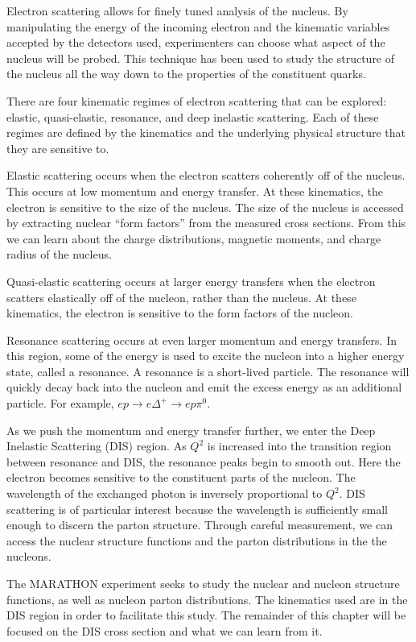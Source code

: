 Electron scattering allows for finely tuned analysis of the nucleus. By manipulating the energy of the incoming electron and the kinematic variables accepted by the detectors used, experimenters can choose what aspect of the nucleus will be probed. This technique has been used to study the structure of the nucleus all the way down to the properties of the constituent quarks.

There are four kinematic regimes of electron scattering that can be explored: elastic, quasi-elastic, resonance, and deep inelastic scattering. Each of these regimes are defined by the kinematics and the underlying physical structure that they are sensitive to.

Elastic scattering occurs when the electron scatters coherently off of the nucleus. This occurs at low momentum and energy transfer. At these kinematics, the electron is sensitive to the size of the nucleus. The size of the nucleus is accessed by extracting nuclear ``form factors'' from the measured cross sections. From this we can learn about the charge distributions, magnetic moments, and charge radius of the nucleus.

Quasi-elastic scattering occurs at larger energy transfers when the electron scatters elastically off of the nucleon, rather than the nucleus. At these kinematics, the electron is sensitive to the form factors of the nucleon.

Resonance scattering occurs at even larger momentum and energy transfers. In this region, some of the energy is used to excite the nucleon into a higher energy state, called a resonance. A resonance is a short-lived particle. The resonance will quickly decay back into the nucleon and emit the excess energy as an additional particle. For example, $ep \rightarrow e\Delta^+ \rightarrow ep\pi^0$.

As we push the momentum and energy transfer further, we enter the Deep Inelastic Scattering (DIS) region. As $Q^2$ is increased into the transition region between resonance and DIS, the resonance peaks begin to smooth out. Here the electron becomes sensitive to the constituent parts of the nucleon. The wavelength of the exchanged photon is inversely proportional to $Q^2$. DIS scattering is of particular interest because the wavelength is sufficiently small enough to discern the parton structure. Through careful measurement, we can access the nuclear structure functions and the parton distributions in the the nucleons.\cite{HaM,PaN,NaPP}

The MARATHON experiment seeks to study the nuclear and nucleon structure functions, as well as nucleon parton distributions. The kinematics used are in the DIS region in order to facilitate this study. The remainder of this chapter will be focused on the DIS cross section and what we can learn from it.

